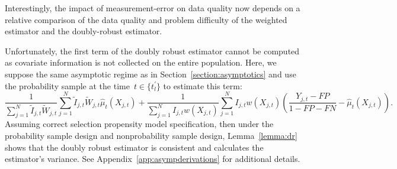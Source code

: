 \documentclass[11pt]{amsart}
\numberwithin{equation}{section}
\theoremstyle{plain}
\begin{document}
 Interestingly, the impact of measurement-error on data quality now depends on a relative comparison of the data quality and problem difficulty of the weighted estimator and the doubly-robust estimator.

 Unfortunately, the first term of the doubly robust estimator cannot be computed as covariate information is not collected on the entire population.  Here, we suppose the same asymptotic regime as in Section~\ref{section:asymptotics} and use the probability sample at the time~$t \in \{t_l^\prime\}$ to estimate this term:
 $$
 \frac{1}{\sum_{j=1}^N \tilde I_{j,t} \tilde W_{j,t}} \sum_{j=1}^N  \tilde I_{j,t} \tilde W_{j,t} \hat \mu_{t} (X_{j,t}) + \frac{1}{\sum_{j=1}^N I_{j,t} w (X_{j,t})} \sum_{j=1}^N I_{j,t} w(X_{j,t}) \left( \frac{Y_{j,t} - FP}{1 - FP - FN} - \hat \mu_t(X_{j,t}) \right).
 $$
 Assuming correct selection propensity model specification, then under the probability sample design and nonprobability sample design, Lemma~\ref{lemma:dr} shows that the doubly robust estimator is consistent and calculates the estimator's variance. See Appendix~\ref{app:asympderivations} for additional details.
\end{document}
